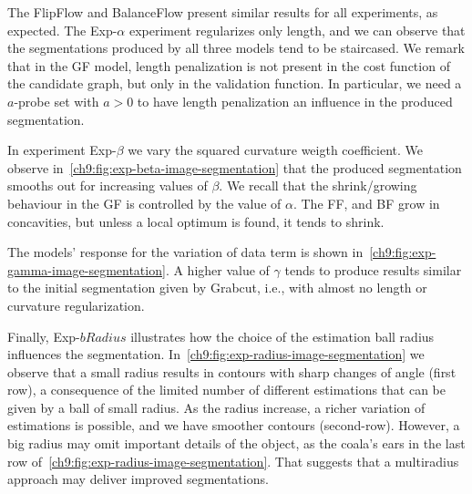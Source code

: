 The FlipFlow and BalanceFlow present similar results for all experiments, as expected. The Exp-$\alpha$ experiment regularizes only length, and we can observe that the segmentations produced by all three models tend to be staircased. We remark that in the GF model, length penalization is not present in the cost function of the candidate graph, but only in the validation function. In particular, we need  a $a$-probe set with $a>0$ to have length penalization an influence in the produced segmentation.

In experiment Exp-$\beta$ we vary the squared curvature weigth coefficient. We observe in~\cref{ch9:fig:exp-beta-image-segmentation} that the produced segmentation smooths out for increasing values of $\beta$. We recall that the shrink/growing behaviour in the GF is controlled by the value of $\alpha$. The FF, and BF grow in concavities, but unless a local optimum is found, it tends to shrink.

The models' response for the variation of data term is shown in~\cref{ch9:fig:exp-gamma-image-segmentation}. A higher value of $\gamma$ tends to produce results similar to the initial segmentation given by Grabcut, i.e., with almost no length or curvature regularization.

Finally, Exp-$bRadius$ illustrates how the choice of the estimation ball radius influences the segmentation. In~\cref{ch9:fig:exp-radius-image-segmentation} we observe that a small radius results in contours with sharp changes of angle (first row), a consequence of the limited number of different estimations that can be given by a ball of small radius. As the radius increase, a richer variation of estimations is possible, and we have smoother contours (second-row). However, a big radius may omit important details of the object, as the coala's ears in the last row of~\cref{ch9:fig:exp-radius-image-segmentation}. That suggests that a multiradius approach may deliver improved segmentations.


